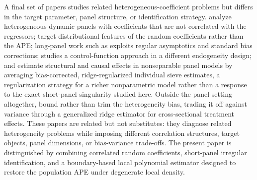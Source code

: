 \documentclass{article}
\begin{document}
A final set of papers studies related heterogeneous-coefficient problems but differs in the target parameter, panel structure, or identification strategy. \cite{PESARAN199579} analyze heterogeneous dynamic panels with coefficients that are not correlated with the regressors; \cite{ArellanoB2012} target distributional features of the random coefficients rather than the APE; long-panel work such as \cite{CorrelatedPanelModelLargeT} exploits regular asymptotics and standard bias corrections; \cite{LAAGE2024105804} studies a control-function approach in a different endogeneity design; and \cite{hausman2025linear} estimate structural and causal effects in nonseparable panel models by averaging bias-corrected, ridge-regularized individual sieve estimates, a regularization strategy for a richer nonparametric model rather than a response to the exact short-panel singularity studied here. Outside the panel setting altogether, \cite{kwon2026estimatingtreatmenteffectsbounded} bound rather than trim the heterogeneity bias, trading it off against variance through a generalized ridge estimator for cross-sectional treatment effects. These papers are related but not substitutes: they diagnose related heterogeneity problems while imposing different correlation structures, target objects, panel dimensions, or bias-variance trade-offs. The present paper is distinguished by combining correlated random coefficients, short-panel irregular identification, and a boundary-based local polynomial estimator designed to restore the population APE under degenerate local density.
\end{document}
